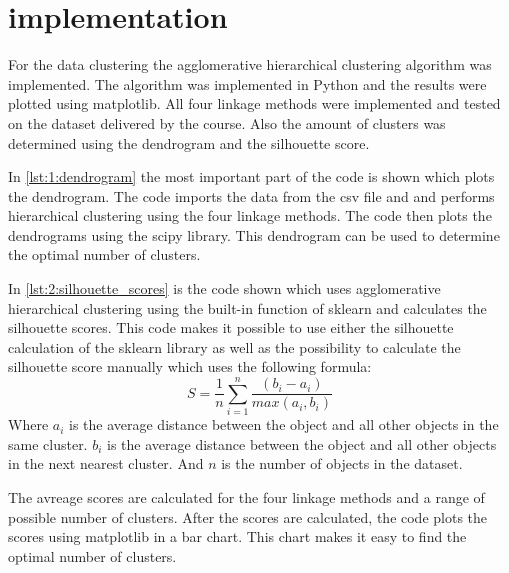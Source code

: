 \documentclass[twoside, a4paper, fleqn, reqno]{article}
\begin{document}
\section*{implementation}
For the data clustering the agglomerative hierarchical clustering algorithm was implemented.
The algorithm was implemented in Python and the results were plotted using matplotlib.
All four linkage methods were implemented and tested on the dataset delivered by the course.
Also the amount of clusters was determined using the dendrogram and the silhouette score.



In \autoref{lst:1:dendrogram} the most important part of the code is shown which plots the dendrogram.
The code imports the data from the csv file and and performs hierarchical clustering using
the four linkage methods. The code then plots the dendrograms using the scipy library.
This dendrogram can be used to determine the optimal number of clusters.



In \autoref{lst:2:silhouette_scores} is the code shown which uses agglomerative hierarchical clustering
using the built-in function of sklearn and calculates the silhouette scores.
This code makes it possible to use either the silhouette calculation of the sklearn library
as well as the possibility to calculate the silhouette score manually which uses the following formula:
\begin{equation*}
S = \frac{1}{n} \sum_{i=1}^n \frac{(b_i - a_i)}{max(a_i, b_i)}
\end{equation*}
Where $a_i$ is the average distance between the object and all other objects in the same cluster.
$b_i$ is the average distance between the object and all other objects in the next nearest cluster.
And $n$ is the number of objects in the dataset.
\par
The avreage scores are calculated for the four linkage methods and a range of possible number of clusters.
After the scores are calculated, the code plots the scores using matplotlib in a bar chart.
This chart makes it easy to find the optimal number of clusters.


\end{document}

